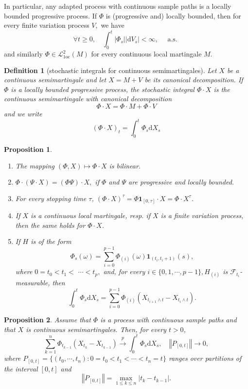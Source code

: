 \documentclass{report}
\newtheorem{definition}{Definition}[section]
\newtheorem{proposition}{Proposition}[section]
\theoremstyle{nonumberplain}
\begin{document}
In particular, any adapted process with continuous sample paths is a locally bounded progressive process. If $\Phi$ is (progressive and) locally bounded, then for every finite variation process $V,$ we have
\[
\forall t \geq 0, \quad \int_{0}^{t}\left|\Phi_{s}\right|\left|\mathrm{d} V_{s}\right|<\infty, \quad \text { a.s. }
\]
and similarly $\Phi \in \mathscr{L}_{1 \mathrm{oc}}^{2}(M)$ for every continuous local martingale $M$.

\begin{definition}[stochastic integrals for continuous semimartingales]
	Let $X$ be a continuous semimartingale and let $X=M+V$ be its canonical decomposition. If $\Phi$ is a locally bounded progressive process, the stochastic integral $\Phi \cdot X$ is the continuous semimartingale with canonical decomposition
	\[
	\Phi \cdot X=\Phi \cdot M+\Phi \cdot V
	\]
	and we write
	\[
	(\Phi \cdot X)_{t}=\int_{0}^{t} \Phi_{s} \mathrm{d} X_{s}
	\]
\end{definition}


\begin{proposition}
	\begin{enumerate}
		\item The mapping $(\Phi, X) \mapsto \Phi \cdot X$ is bilinear.
		\item $\Phi \cdot(\Psi \cdot X)=(\Phi \Psi) \cdot X,$ if $\Phi$ and $\Psi$ are progressive and locally bounded.
		\item For every stopping time $\tau$, $(\Phi \cdot X)^{\tau}=\Phi \mathbf{1}_{[0, \tau]} \cdot X=\Phi \cdot X^{\tau}$.
		\item If $X$ is a continuous local martingale, resp. if $X$ is a finite variation process, then the same holds for $\Phi \cdot X$.
		\item If $H$ is of the form 
		$$
		\Phi_{s}(\omega)=\sum_{i=0}^{p-1} \Phi_{(i)}(\omega) \mathbf{1}_{\left(t_{i}, t_{i}+1\right)}(s),
		$$
		where $0=t_{0}<t_{1}<$
		$\cdots<t_{p},$ and, for every $i \in\{0,1, \cdots, p-1\}, H_{(i)}$ is $\mathcal{F}_{t_{i}}$-measurable, then
		\[
		\int_{0}^{t} \Phi_{s} \mathrm{d} X_{s}=\sum_{i=0}^{p-1} \Phi_{(i)}\left(X_{t_{i+1} \wedge t}-X_{t_{i} \wedge t}\right).
		\]
	\end{enumerate}
\end{proposition}


\begin{proposition}
	Assume that $\Phi$ is a process with continuous sample paths and that $X$ is continuous semimartingales. Then, for every $t>0$,
	\[
	\sum_{k=1}^{n} \Phi_{t_{k-1}}\left(X_{t_{k}}-X_{t_{k-1}}\right)\stackrel{p}{\longrightarrow}\int_{0}^{t} \Phi_{s} \mathrm{d} X_{s},\quad\left\Vert P_{[0,t]}\right\Vert \longrightarrow 0,
	\]
	where $P_{[0,t]}=\{(t_0,\cdots,t_n):0=t_0<t_1<\cdots<t_n=t\}$ ranges over partitions of the interval $[0,t]$ and 
	\[
	\left\Vert P_{[0,t]}\right\Vert=\max\limits_{1\le k\le n}{|t_k-t_{k-1}|}.
	\]
\end{proposition}
\end{document}
